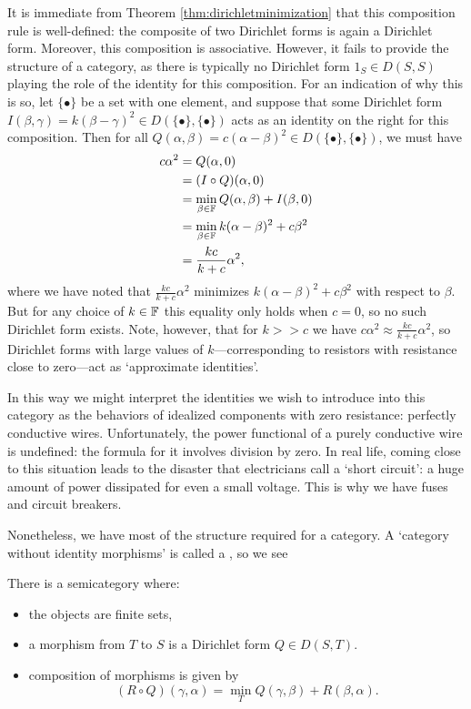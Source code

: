 It is immediate from Theorem \ref{thm:dirichletminimization} that this
composition rule is well-defined: the composite of two Dirichlet forms is again
a Dirichlet form. Moreover, this composition is associative. However, it fails
to provide the structure of a category, as there is typically no Dirichlet form
$1_S \in D(S,S)$ playing the role of the identity for this composition. For an
indication of why this is so, let $\{\bullet\}$ be a set with one element, and
suppose that some Dirichlet form $I(\beta,\gamma) = k(\beta-\gamma)^2 \in
D(\{\bullet\},\{\bullet\})$ acts as an identity on the right for this
composition. Then for all $Q(\alpha,\beta) = c(\alpha-\beta)^2 \in
D(\{\bullet\},\{\bullet\})$, we must have
\begin{align*}
  c\alpha^2 &= Q(\alpha,0) \\
  &= (I \circ Q)(\alpha,0) \\ 
  &= \min_{\beta \in {\mathbb F}} Q(\alpha, \beta) + I(\beta,0) \\
  &= \min_{\beta \in {\mathbb F}} k(\alpha-\beta)^2 + c\beta^2 \\
  &= \frac{kc}{k+c}\alpha^2,
\end{align*}
where we have noted that $\frac{kc}{k+c}\alpha^2$ minimizes $k(\alpha-\beta)^2 +
c\beta^2$ with respect to $\beta$. But for any choice of $k \in {\mathbb F}$ this
equality only holds when $c = 0$, so no such Dirichlet form exists. Note,
however, that for $k>> c$ we have $c\alpha^2 \approx \frac{kc}{k+c}\alpha^2$, so
Dirichlet forms with large values of $k$---corresponding to resistors with
resistance close to zero---act as `approximate identities'.

In this way we might interpret the identities we wish to introduce
into this category as the behaviors of idealized components with zero
resistance: perfectly conductive wires. Unfortunately, the power functional of a
purely conductive wire is undefined: the formula for it involves division by
zero.  In real life, coming close to this situation leads to the disaster that
electricians call a `short circuit': a huge amount of power dissipated for even
a small voltage.  This is why we have fuses and circuit breakers.

Nonetheless, we have most of the structure required for a category. A `category
without identity morphisms' is called a , so we see
\begin{proposition}
There is a semicategory where:
\begin{itemize}
\item the objects are finite sets,

\item a morphism from $T$ to $S$ is a Dirichlet form $Q \in D(S,T)$.  

\item composition of morphisms is given by 
\[
(R \circ Q)(\gamma, \alpha) = \min_{T} Q(\gamma, \beta) + R(\beta, \alpha).
\]

\end{itemize}
\end{proposition}

